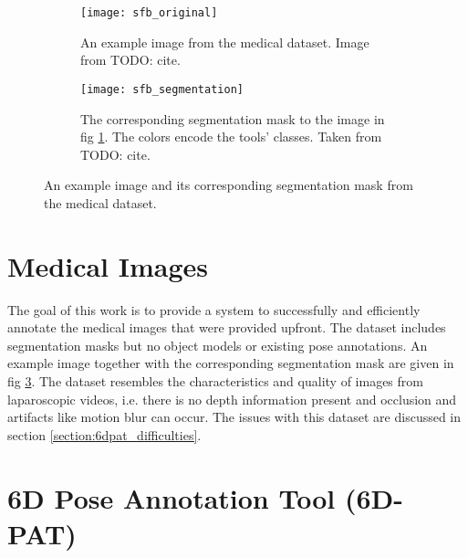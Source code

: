 \begin{figure}[!tbp]
	\centering
	\begin{subfigure}[t]{0.47\textwidth}
	\centering
    	\texttt{[image: sfb\_original]}
    	\caption{An example image from the medical dataset. Image from TODO: cite.}
    	\label{fig:sfb_original}
	\end{subfigure}
	\hfill
	\begin{subfigure}[t]{0.47\textwidth}
	\centering
    	\texttt{[image: sfb\_segmentation]}
    	\caption{The corresponding segmentation mask to the image in fig \ref{fig:sfb_original}. The colors encode the tools' classes. Taken from TODO: cite.}
    	\label{fig:sfb_segmentation}
	\end{subfigure}
	\caption{An example image and its corresponding segmentation mask from the medical dataset.}
	\label{fig:sfb}
\end{figure} 

\section{Medical Images}

The goal of this work is to provide a system to successfully and efficiently annotate the medical images that were provided upfront. The dataset includes segmentation masks but no object models or existing pose annotations. An example image together with the corresponding segmentation mask are given in fig \ref{fig:sfb}. The dataset resembles the characteristics and quality of images from laparoscopic videos, i.e. there is no depth information present and occlusion and artifacts like motion blur can occur. The issues with this dataset are discussed in section \ref{section:6dpat_difficulties}. 

\section{6D Pose Annotation Tool (6D-PAT)}

